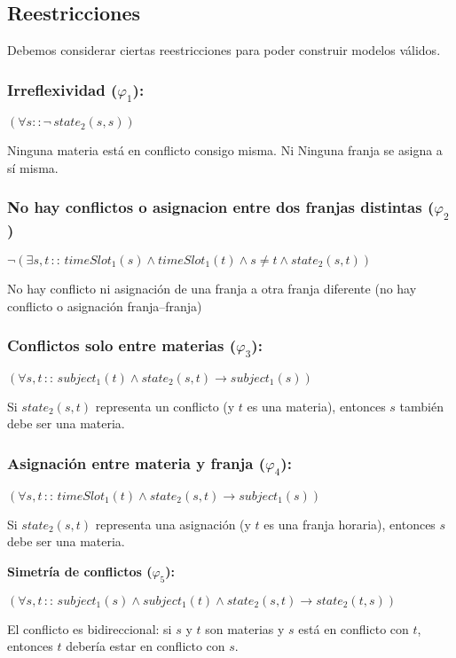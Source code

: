 \documentclass[a4paper,11pt]{article}
\begin{document}
\newpage

\subsection{Reestricciones}
Debemos considerar ciertas reestricciones para poder construir modelos válidos.


\subsubsection{Irreflexividad ($\varphi_1$):}
\begin{center}
    $(\forall s :: \neg \, state_2(s, s))$
\end{center}
Ninguna materia está en conflicto consigo misma. Ni Ninguna franja se asigna a sí misma.
\subsubsection{No hay conflictos o asignacion entre dos franjas distintas ($\varphi_2$)}
\begin{center}
    $\neg(\exists s, t \,::\, timeSlot_1(s) \land timeSlot_1(t) \land s \neq t \land state_2(s, t))$ \\
\end{center}
No hay conflicto ni asignación de una franja a otra franja diferente (no hay conflicto o asignación franja–franja)

\subsubsection{Conflictos solo entre materias ($\varphi_3$):}
\begin{center}
    $(\forall s, t \,::\, subject_1(t) \land state_2(s,t) \rightarrow subject_1(s))$
\end{center}
Si $state_2(s,t)$ representa un conflicto (y $t$ es una materia), entonces $s$ también debe ser una materia.

\subsubsection{Asignación entre materia y franja ($\varphi_4$):}
\begin{center}
    $(\forall s, t \,::\, timeSlot_1(t) \land state_2(s,t) \rightarrow subject_1(s))$
\end{center}
Si $state_2(s,t)$ representa una asignación (y $t$ es una franja horaria), entonces $s$ debe ser una materia.

\item \textbf{Simetría de conflictos ($\varphi_5$):}
\begin{center}
    $(\forall s, t \,::\, subject_1(s) \land subject_1(t) \land state_2(s, t) \rightarrow state_2(t, s))$
\end{center}
El conflicto es bidireccional: si $s$ y $t$ son materias y $s$ está en conflicto con $t$, entonces $t$ debería estar en conflicto con $s$.
\end{document}
